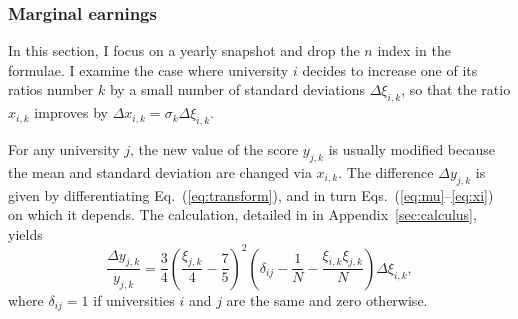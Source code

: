 \documentclass[twocolumn]{article}
\def\eqref#1{Eq.~(\ref{eq:#1})}
\def\eqsref#1#2{Eqs.~(\ref{eq:#1}--\ref{eq:#2})}
\begin{document}
\subsubsection{Marginal earnings}
\label{sec:marginal} 

In this section, I focus on a yearly snapshot and drop the $n$ index in the formulae.  I examine the case where university $i$ decides to increase one of its ratios number $k$ by a small number of standard deviations $\Delta\xi_{i,k}$, so that the ratio $x_{i,k}$ improves by $\Delta x_{i,k} = \sigma_k\Delta\xi_{i,k}$.

For any university $j$, the new value of the score $y_{j,k}$ is usually modified because the mean and standard deviation are changed via $x_{i,k}$.  The difference $\Delta y_{j,k}$ is given by differentiating \eqref{transform}, and in turn \eqsref{mu}{xi} on which it depends.
The calculation, detailed in  in Appendix~\ref{sec:calculus}, yields
\begin{equation}
    \frac{\Delta y_{j,k}}{y_{j,k}} = 
        \frac34 \left(\frac{\xi_{j,k}}4 -  \frac75\right)^2 
        \left(
            \delta_{ij} 
          - \frac 1N - \frac{\xi_{i,k}\xi_{j,k}}{N}
        \right)
        \Delta \xi_{i,k},
        \label{eq:modif}
\end{equation}
where $\delta_{ij} = 1$ if universities $i$ and $j$ are the same and zero otherwise.
\end{document}

